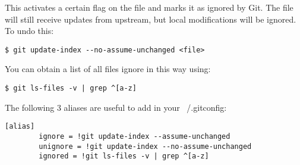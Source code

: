 \documentclass{../common/tufte-latex/tufte-handout}
\begin{document}
This activates a certain flag on the file and marks it as ignored by Git.
The file will still receive updates from upstream, but local modifications will be ignored.
To undo this:

\begin{lstlisting}[style=BashInputStyle]
  $ git update-index --no-assume-unchanged <file>
\end{lstlisting}

You can obtain a list of all files ignore in this way using:

\begin{lstlisting}[style=BashInputStyle]
  $ git ls-files -v | grep ^[a-z]
\end{lstlisting}

The following 3 aliases are useful to add in your ~/.gitconfig:

\begin{lstlisting}[style=BashInputStyle]
[alias]
        ignore = !git update-index --assume-unchanged 
        unignore = !git update-index --no-assume-unchanged
        ignored = !git ls-files -v | grep ^[a-z]
\end{lstlisting}



\end{document}
